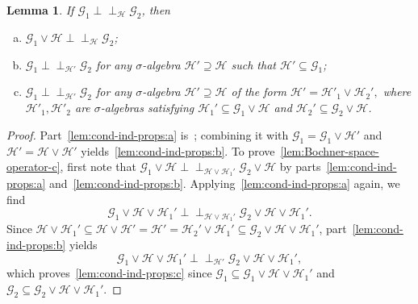 \documentclass[reqno]{amsart}
\numberwithin{equation}{section}
\newcommand{\cG}{\mathcal{G}}
\newcommand{\cH}{\mathcal{H}}
\newcommand{\ind}{\perp\!\!\!\perp}
\newtheorem{lemma}{Lemma}[section]
\theoremstyle{remark}
\theoremstyle{definition}
\begin{document}
\begin{lemma}\label{lem:cond-ind-props}
	If $\cG_1 \ind_{\cH} \cG_2$, then
	\begin{enumerate}[(a)]
		\item $\cG_1 \vee \cH \ind_{\cH} \cG_2$; \label{lem:cond-ind-props:a}
		\item $\cG_1 \ind_{\cH'} \cG_2$ for any $\sigma$-algebra $\cH' \supseteq \cH$ such that $\cH' \subseteq \cG_1$; \label{lem:cond-ind-props:b}
		\item $\cG_1 \ind_{\cH'} \cG_2$ for any $\sigma$-algebra $\cH' \supseteq \cH$ of the form 
		$
		\cH' = \cH'_1 \vee \cH_2',
		$
		where $\cH'_1,\cH'_2$ are $\sigma$-algebras satisfying 
		$\cH_1' \subseteq \cG_1 \vee \cH$ and $\cH_2' \subseteq \cG_2 \vee \cH$. \label{lem:cond-ind-props:c}
	\end{enumerate}
\end{lemma}
%
\begin{proof}
	Part~\ref{lem:cond-ind-props:a} is~\cite[Corollary~8.11(i)]{Kallenberg2002};
	combining it with
	$\cG_1 = \cG_1 \vee \cH'$
	and ${\cH' = \cH \vee \cH'}$ yields~\ref{lem:cond-ind-props:b}.
	To prove~\ref{lem:Bochner-space-operator-c}, first note that
	$\cG_1 \vee \cH \ind_{\cH \vee \cH_1'} \cG_2 \vee \cH$
	by parts~\ref{lem:cond-ind-props:a} and~\ref{lem:cond-ind-props:b}.
	Applying~\ref{lem:cond-ind-props:a} again, we find
	\[
	\cG_1 \vee \cH \vee \cH_1' \ind_{\cH \vee \cH_1'} \cG_2 \vee \cH \vee \cH_1'.
	\]
	Since $\cH \vee \cH_1' \subseteq \cH \vee \cH' = \cH'
	= \cH_2' \vee \cH_1' \subseteq \cG_2 \vee \cH \vee \cH_1'$, part~\ref{lem:cond-ind-props:b}
	yields
	\[
	\cG_1 \vee \cH \vee \cH_1' \ind_{\cH'} \cG_2 \vee \cH \vee \cH_1',
	\]
	which proves~\ref{lem:cond-ind-props:c} since $\cG_1 \subseteq \cG_1 \vee \cH \vee \cH_1'$ 
	and $\cG_2 \subseteq \cG_2 \vee \cH \vee \cH_1'$.
\end{proof}

\end{document}
